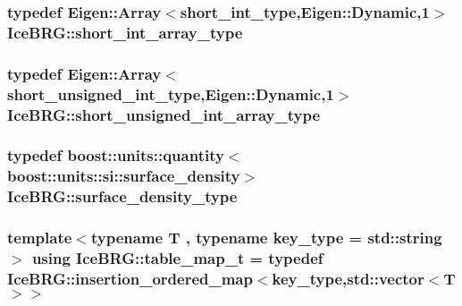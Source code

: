 \subsubsection[{short\+\_\+int\+\_\+array\+\_\+type}]{\setlength{\rightskip}{0pt plus 5cm}typedef Eigen\+::\+Array$<${\bf short\+\_\+int\+\_\+type},Eigen\+::\+Dynamic,1$>$ {\bf Ice\+B\+R\+G\+::short\+\_\+int\+\_\+array\+\_\+type}}\label{namespaceIceBRG_a5dfb15d72d312a490f6e4db9e75f4359}
\hypertarget{namespaceIceBRG_a7acb9cc3ca6afdd487166f5c720a308c}{}
\subsubsection[{short\+\_\+unsigned\+\_\+int\+\_\+array\+\_\+type}]{\setlength{\rightskip}{0pt plus 5cm}typedef Eigen\+::\+Array$<${\bf short\+\_\+unsigned\+\_\+int\+\_\+type},Eigen\+::\+Dynamic,1$>$ {\bf Ice\+B\+R\+G\+::short\+\_\+unsigned\+\_\+int\+\_\+array\+\_\+type}}\label{namespaceIceBRG_a7acb9cc3ca6afdd487166f5c720a308c}
\hypertarget{namespaceIceBRG_a80c597ef5ba0a32491d32a9f0083b02d}{}
\subsubsection[{surface\+\_\+density\+\_\+type}]{\setlength{\rightskip}{0pt plus 5cm}typedef boost\+::units\+::quantity$<$boost\+::units\+::si\+::surface\+\_\+density$>$ {\bf Ice\+B\+R\+G\+::surface\+\_\+density\+\_\+type}}\label{namespaceIceBRG_a80c597ef5ba0a32491d32a9f0083b02d}
\hypertarget{namespaceIceBRG_a30d3b56b57feeb81f66815ff1bfaec6c}{}
\subsubsection[{table\+\_\+map\+\_\+t}]{\setlength{\rightskip}{0pt plus 5cm}template$<$typename T , typename key\+\_\+type  = std\+::string$>$ using {\bf Ice\+B\+R\+G\+::table\+\_\+map\+\_\+t} = typedef {\bf Ice\+B\+R\+G\+::insertion\+\_\+ordered\+\_\+map}$<$key\+\_\+type,std\+::vector$<$T$>$$>$}\label{namespaceIceBRG_a30d3b56b57feeb81f66815ff1bfaec6c}
\hypertarget{namespaceIceBRG_a59734b1a7b525d7d926f69a91bc8553b}{}

